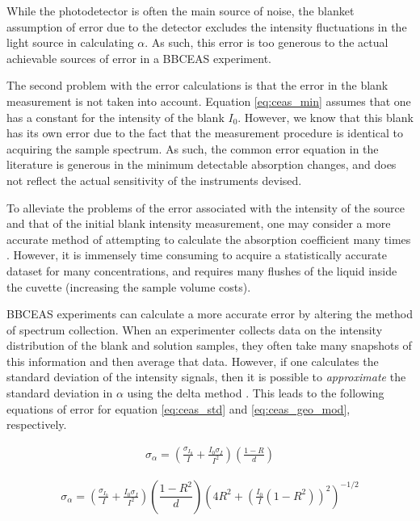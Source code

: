 
While the photodetector is often the main source of noise, the blanket
assumption of error due to the detector excludes the intensity fluctuations in
the light source in calculating $\alpha$. As such, this error is too generous
to the actual achievable sources of error in a \ac{BBCEAS} experiment.

The second problem with the error calculations is that the error in the blank
measurement is not taken into account. Equation \eqref{eq:ceas_min} assumes
that one has a constant for the intensity of the blank $I_0$. However, we know
that this blank has its own error due to the fact that the measurement
procedure is identical to acquiring the sample spectrum. As such, the common
error equation in the literature is generous in the minimum detectable
absorption changes, and does not reflect the actual sensitivity of the
instruments devised.

To alleviate the problems of the error associated with the intensity of the
source and that of the initial blank intensity measurement, one may consider
a more accurate method of attempting to calculate the absorption coefficient
many times \cite{Islam:2007ea}. However, it is immensely time consuming to
acquire a statistically accurate dataset for many concentrations, and requires
many flushes of the liquid inside the cuvette (increasing the sample volume
costs).

\ac{BBCEAS} experiments can calculate a more accurate error by altering the
method of spectrum collection. When an experimenter collects data on the
intensity distribution of the blank and solution samples, they often take many
snapshots of this information and then average that data. However, if one
calculates the standard deviation of the intensity signals, then it is possible
to \emph{approximate} the standard deviation in $\alpha$ using the delta method
\cite{Casella:2002tp}. This leads to the following equations of error for
equation \eqref{eq:ceas_std} and \eqref{eq:ceas_geo_mod}, respectively.

    \begin{align}
      \sigma_\alpha = \left(\frac{\sigma_{I_0}}{I} +
             \frac{I_0\sigma_I}{I^2}\right)
            \left(\frac{1-R}{d}\right)\label{eq:ceas_err_std}
    \end{align}


    \begin{align}
      \sigma_\alpha = \left(\frac{\sigma_{I_0}}{I} +
             \frac{I_0\sigma_I}{I^2}\right)
            \left(\dfrac{1-R^2}{d}\right)\left(4R^2+\left(
                                     \frac{I_0}{I}(1-R^2)\right)^2
                                     \right)^{-1/2}\label{eq:ceas_err_geo}
    \end{align}

